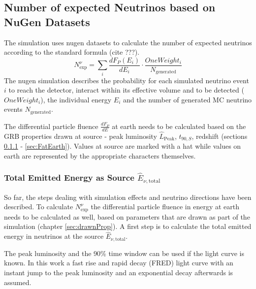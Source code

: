 \subsection{Number of expected Neutrinos based on NuGen Datasets}
The simulation uses nugen datasets to calculate the number of expected
neutrinos according to the standard formula (cite ???).
\begin{equation}
\label{eq:Nexp_general}
 N_\text{exp}^\nu = \sum_i\frac{dF_P(E_i)}{dE_i} \cdot
\frac{OneWeight_i}{N_\text{generated}}
\end{equation}
The nugen simulation describes the probability for each simulated neutrino event
$i$ to reach the detector,
interact within its effective volume and to be detected ($OneWeight_i$), the
individual energy $E_i$ and the number of generated MC neutrino events
$N_\text{generated}$.

The differential particle fluence $\frac{dF_P}{dE}$ at earth needs to be
calculated based on the GRB properties drawn at source - peak luminosity
$\hat{L}_\text{Peak}$, $\hat{t}_{90, S}$, redshift (sections \ref{sec:Etotal} -
\ref{sec:FatEarth}). Values at source are marked with a
hat while values on earth are represented by the appropriate characters 
themselves.








\subsubsection{Total Emitted Energy as Source $\hat{E}_{\nu, \text{total}}$}
\label{sec:Etotal}
So far, the steps dealing with simulation effects and neutrino directions have
been described. To calculate $N_\text{exp}^\nu$ the differential particle
fluence in energy at earth needs to be calculated as well, based on parameters
that are drawn as part of the simulation (chapter \ref{sec:drawnProp}). A first
step is to calculate the total emitted energy in neutrinos at the source
$\hat{E}_{\nu, \text{total}}$.

The peak luminosity and the 90\% time window can be used if the light curve is
known. In
this work a fast rise and rapid decay (FRED) light curve with an instant jump
to the peak luminosity and an exponential decay afterwards is assumed. 

